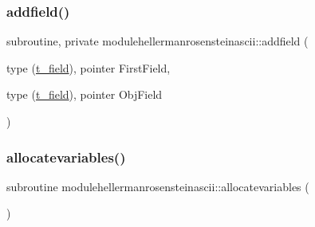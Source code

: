 \subsubsection{\texorpdfstring{addfield()}{addfield()}}
{\footnotesize\ttfamily subroutine, private modulehellermanrosensteinascii\+::addfield (\begin{DoxyParamCaption}\item[{type (\mbox{\hyperlink{structmodulehellermanrosensteinascii_1_1t__field}{t\+\_\+field}}), pointer}]{First\+Field,  }\item[{type (\mbox{\hyperlink{structmodulehellermanrosensteinascii_1_1t__field}{t\+\_\+field}}), pointer}]{Obj\+Field }\end{DoxyParamCaption})\hspace{0.3cm}{\ttfamily [private]}}

\mbox{\label{namespacemodulehellermanrosensteinascii_ada851e8286a0ae4a7c890a405aefca9e}} 
\subsubsection{\texorpdfstring{allocatevariables()}{allocatevariables()}}
{\footnotesize\ttfamily subroutine modulehellermanrosensteinascii\+::allocatevariables (\begin{DoxyParamCaption}{ }\end{DoxyParamCaption})\hspace{0.3cm}{\ttfamily [private]}}

